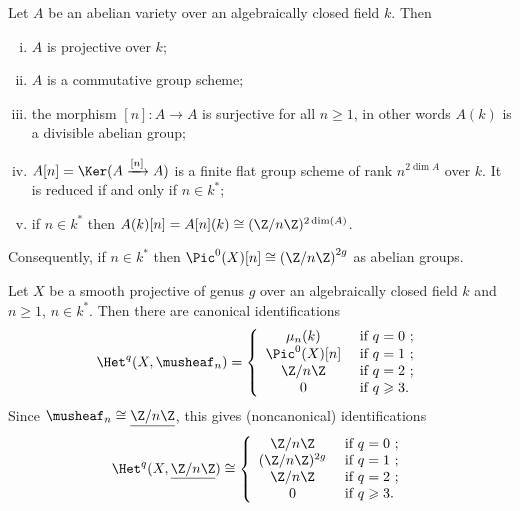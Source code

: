 \begin{prop} \label{prop:ReviewAbelianVarieties}
Let $A$ be an abelian variety over an algebraically closed field $k$. Then
\begin{enumerate}[i.]
\item 
$A$ is projective over $k$;
\item  
$A$ is a commutative group scheme;
\item 
the morphism $[n]: A\to A$ is surjective for all $n\geqslant 1$, in other words $A(k)$ is a divisible abelian group;
\item 
$A[n] = \Ker(A\xrightarrow{[n]} A)$ is a finite flat group scheme of rank $n^{2\dim A}$ over $k$. It is reduced if and only if $n\in k^*$;
\item 
if $n\in k^*$ then $A(k)[n] = A[n](k)\cong(\Z/n\Z)^{2\dim(A)}$.
\end{enumerate}
\end{prop}

Consequently, if $n\in k^*$ then $\Pic^0(X)[n] \cong \left(\Z/n\Z\right)^{2g}$ as abelian groups. 

\begin{cor} \label{cor:CohomologyOfASmoothProjectiveCurve}
Let $X$ be a smooth projective of genus $g$ over an algebraically closed field $k$ and $n\geqslant 1$, $n\in k^*$. Then there are canonical identifications
$$
\Het^q(X, \musheaf_n) = 
\left\{ \begin{array}{cl}
 \mu_n(k) & \text{ if $q=0$ ;} \\
\Pic^0(X)[n] & \text{ if $q=1$ ;} \\
\Z/n\Z & \text{ if $q=2$ ;}\\
0 & \text{ if $q \geqslant 3$.}
\end{array}
\right.
$$
Since $\musheaf_n \cong \underline{\Z/n\Z}$, this gives (noncanonical) identifications
$$
\Het^q(X, \underline{\Z/n\Z}) \cong 
\left\{ \begin{array}{cl}
 \Z/n\Z & \text{ if $q=0$ ;} \\
(\Z/n\Z)^{2g} & \text{ if $q=1$ ;} \\
\Z/n\Z & \text{ if $q=2$ ;}\\
0 & \text{ if $q \geqslant 3$.}
\end{array}
\right.
$$
\end{cor}	

